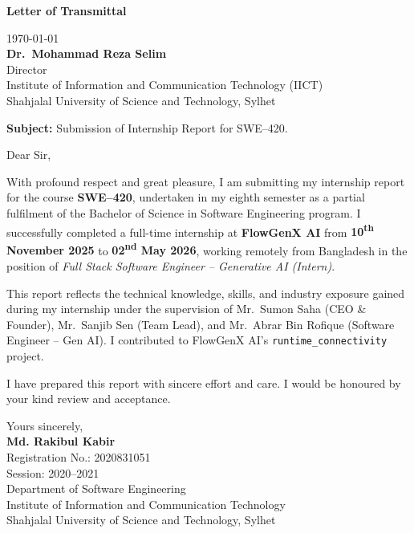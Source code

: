 \thispagestyle{empty}
\noindent
\begin{center}
    {\Large \textbf{Letter of Transmittal}}
\end{center}

\vspace{0.8cm}

\noindent
\today \\[0.3cm]
\textbf{Dr.~Mohammad Reza Selim} \\
Director \\
Institute of Information and Communication Technology (IICT) \\
Shahjalal University of Science and Technology, Sylhet \\

\vspace{0.4cm}

\noindent
\textbf{Subject:} Submission of Internship Report for SWE--420.

\vspace{0.5cm}

\noindent
Dear Sir,

\vspace{0.3cm}

\noindent
With profound respect and great pleasure, I am submitting my internship
report for the course \textbf{SWE--420}, undertaken in my eighth semester
as a partial fulfilment of the Bachelor of Science in Software Engineering
program. I successfully completed a full-time internship at
\textbf{FlowGenX AI} from \textbf{10\textsuperscript{th} November 2025} to
\textbf{02\textsuperscript{nd} May 2026}, working remotely from
Bangladesh in the position of \emph{Full Stack Software Engineer --
Generative AI (Intern)}.

\vspace{0.3cm}

\noindent
This report reflects the technical knowledge, skills, and industry exposure gained during my internship under the supervision of Mr.~Sumon Saha (CEO \& Founder), Mr.~Sanjib Sen (Team Lead), and Mr.~Abrar Bin Rofique (Software Engineer -- Gen AI). I contributed to FlowGenX AI's \texttt{runtime\_connectivity} project.

\vspace{0.3cm}

\noindent
I have prepared this report with sincere effort and care. I would be honoured by your kind review and acceptance.

\vspace{0.8cm}

\noindent
Yours sincerely, \\[0.6cm]
\textbf{Md. Rakibul Kabir} \\
Registration No.: 2020831051 \\
Session: 2020--2021 \\
Department of Software Engineering \\
Institute of Information and Communication Technology \\
Shahjalal University of Science and Technology, Sylhet

\newpage
